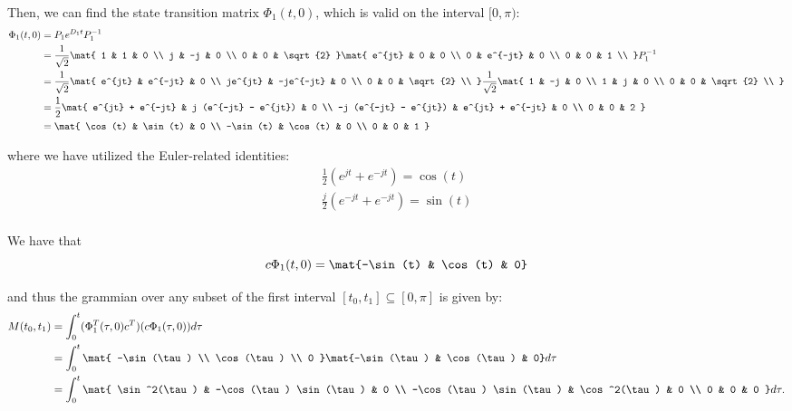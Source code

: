\documentclass{homework}
\begin{document}
Then, we can find the state transition matrix $\Phi_1(t, 0)$, which is valid
on the interval $[0, \pi)$:
\begin{align*}
    \Phi_1(t, 0) &= P_1 e^{D_1t} P_1^{-1} \\
        &= \frac{1}{\sqrt{2}} \mat{
            1 & 1 & 0 \\
            j & -j & 0 \\
            0 & 0 & \sqrt{2}
        } \mat{
            e^{jt} & 0 & 0 \\
            0 & e^{-jt} & 0 \\
            0 & 0 & 1 \\
        } P_1^{-1} \\
        &= \frac{1}{\sqrt{2}} \mat{
            e^{jt} & e^{-jt} & 0 \\
            je^{jt} & -je^{-jt} & 0 \\
            0 & 0 & \sqrt{2} \\
        } \frac{1}{\sqrt{2}} \mat{
            1 & -j & 0 \\
            1 & j & 0 \\
            0 & 0 & \sqrt{2} \\
        } \\
        &= \frac{1}{2} \mat{
            e^{jt} + e^{-jt} & j (e^{-jt} - e^{jt}) & 0 \\
            -j (e^{-jt} - e^{jt}) & e^{jt} + e^{-jt} & 0 \\
            0 & 0 & 2
        } \\
        &= \mat{
            \cos(t) & \sin(t) & 0 \\
            -\sin(t) & \cos(t) & 0 \\
            0 & 0 & 1
        }
\end{align*}

where we have utilized the Euler-related identities:
\begin{align*}
    \frac{1}{2} (e^{jt} + e^{-jt}) = \cos(t) \\
    \frac{j}{2} (e^{-jt} + e^{-jt}) = \sin(t) \\
\end{align*}

We have that
\begin{equation*}
    c \Phi_1(t, 0) = \mat{-\sin(t) & \cos(t) & 0}
\end{equation*}

and thus the grammian over any subset of the first interval
$[t_0, t_1] \subseteq [0, \pi]$ is given by:
\begin{align*}
    M(t_0, t_1) &= \int_{0}^{t} (\Phi_1^T(\tau, 0) c^T) (c \Phi_1(\tau, 0)) d\tau \\
        &= \int_{0}^{t} \mat{
            -\sin(\tau) \\
            \cos(\tau) \\
            0
        } \mat{-\sin(\tau) & \cos(\tau) & 0} d\tau \\
        &= \int_{0}^{t} \mat{
            \sin^2(\tau) & -\cos(\tau) \sin(\tau) & 0 \\
            -\cos(\tau) \sin(\tau) & \cos^2(\tau) & 0 \\
            0 & 0 & 0
        } d\tau.
\end{align*}
\end{document}
